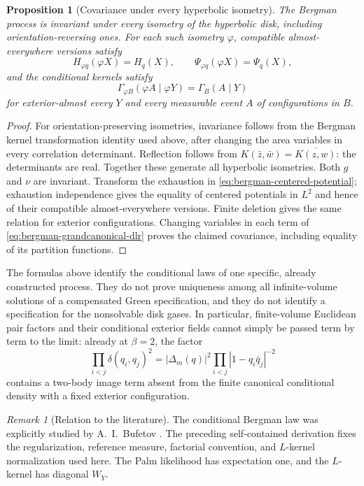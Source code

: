 \documentclass[11pt,a4paper]{article}
\numberwithin{equation}{section}
\newtheorem{proposition}[theorem]{Proposition}
\theoremstyle{definition}
\theoremstyle{remark}
\newtheorem{remark}[theorem]{Remark}
\begin{document}
\begin{proposition}[Covariance under every hyperbolic isometry]
\label{prop:bergman-dlr-isometries}
The Bergman process is invariant under every isometry of the hyperbolic
disk, including orientation-reversing ones.  For each such isometry
$\varphi$, compatible almost-everywhere versions satisfy
\[
 H_{\varphi q}(\varphi X)=H_q(X),\qquad
 \Psi_{\varphi q}(\varphi X)=\Psi_q(X),
\]
and the conditional kernels satisfy
\[
 \Gamma_{\varphi B}(\varphi A\mid\varphi Y)
 =\Gamma_B(A\mid Y)
\]
for exterior-almost every $Y$ and every measurable event $A$ of
configurations in $B$.
\end{proposition}

\begin{proof}
For orientation-preserving isometries, invariance follows from the
Bergman kernel transformation identity used above, after changing the
area variables in every correlation determinant.  Reflection follows
from $K(\bar z,\bar w)=\overline{K(z,w)}$: the determinants are real.
Together these generate all hyperbolic isometries.  Both $g$ and $\nu$
are invariant.  Transform the exhaustion in
\eqref{eq:bergman-centered-potential}; exhaustion independence gives
the equality of centered potentials in $L^2$ and hence of their
compatible almost-everywhere versions.  Finite deletion gives the
same relation for exterior configurations.  Changing variables in
each term of \eqref{eq:bergman-grandcanonical-dlr} proves the claimed
covariance, including equality of its partition functions.
\end{proof}

The formulas above identify the conditional laws of one specific,
already constructed process.  They do not prove uniqueness among all
infinite-volume solutions of a compensated Green specification, and
they do not identify a specification for the nonsolvable disk gases.
In particular, finite-volume Euclidean pair factors and their
conditional exterior fields cannot simply be passed term by term to
the limit: already at $\beta=2$, the factor
\[
 \prod_{i<j}\delta(q_i,q_j)^2
 =|\Delta_m(q)|^2\prod_{i<j}|1-q_i\bar q_j|^{-2}
\]
contains a two-body image term absent from the finite canonical
conditional density with a fixed exterior configuration.

\begin{remark}[Relation to the literature]
The conditional Bergman law was explicitly studied by A.~I.~Bufetov
\cite{BufetovBergman}. The preceding self-contained derivation fixes
the regularization, reference measure, factorial convention, and
$L$-kernel normalization used here. The Palm likelihood has expectation
one, and the $L$-kernel has diagonal $W_Y$.
\end{remark}
\end{document}
